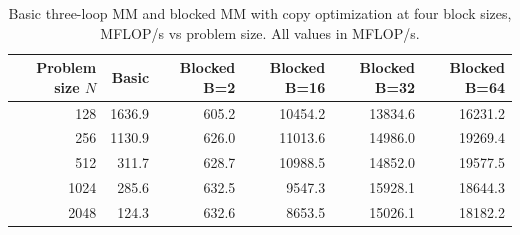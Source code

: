 \begin{table}[htbp]
\centering
\begin{tabular}{rrrrrr}
\hline
Problem size $N$ & Basic & Blocked B=2 & Blocked B=16 & Blocked B=32 & Blocked B=64 \\
\hline
128 & 1636.9 & 605.2 & 10454.2 & 13834.6 & 16231.2 \\
256 & 1130.9 & 626.0 & 11013.6 & 14986.0 & 19269.4 \\
512 & 311.7 & 628.7 & 10988.5 & 14852.0 & 19577.5 \\
1024 & 285.6 & 632.5 & 9547.3 & 15928.1 & 18644.3 \\
2048 & 124.3 & 632.6 & 8653.5 & 15026.1 & 18182.2 \\
\hline
\end{tabular}
\caption{Basic three-loop MM and blocked MM with copy optimization at four block sizes, MFLOP/s vs problem size. All values in MFLOP/s.}
\label{tab:basic_vs_blocked}
\end{table}
